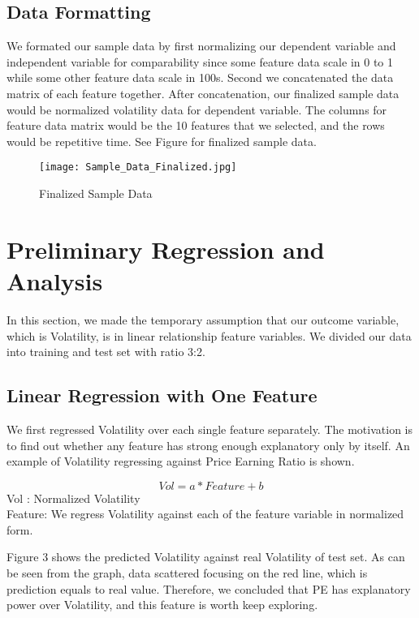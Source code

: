 \documentclass[b4paper]{article}
\begin{document}
\subsection{Data Formatting}
We formated our sample data by first normalizing our dependent variable and independent variable for comparability since some feature data scale in 0 to 1 while some other feature data scale in 100s. Second we concatenated the data matrix of each feature together. After concatenation, our finalized sample data would be normalized volatility data for dependent variable. The columns for feature data matrix would be the 10 features that we selected, and the rows would be repetitive time. See Figure for finalized sample data.

\begin{figure}[h]
\centering
\texttt{[image: Sample\_Data\_Finalized.jpg]}
\caption{\label{fig:sample final data}Finalized Sample Data}
\end{figure}

\section{Preliminary Regression and Analysis}
\label{sec:theory}
In this section, we made the temporary assumption that our outcome variable, which is Volatility, is in linear relationship feature variables. We divided our data into training and test set with ratio 3:2.

\subsection{Linear Regression with One Feature}
We first regressed Volatility over each single feature separately. The motivation is to find out whether any feature has strong enough explanatory only by itself. An example of Volatility regressing against Price Earning Ratio is shown.

\begin{equation}
Vol = a*Feature+b
\end{equation}
Vol : Normalized Volatility
\\Feature: We regress Volatility against each of the feature variable in normalized form.

Figure 3 shows the predicted Volatility against real Volatility of test set. As can be seen from the graph, data scattered focusing on the red line, which is prediction equals to real value. Therefore, we concluded that PE has explanatory power over Volatility, and this feature is worth keep exploring.
\end{document}
